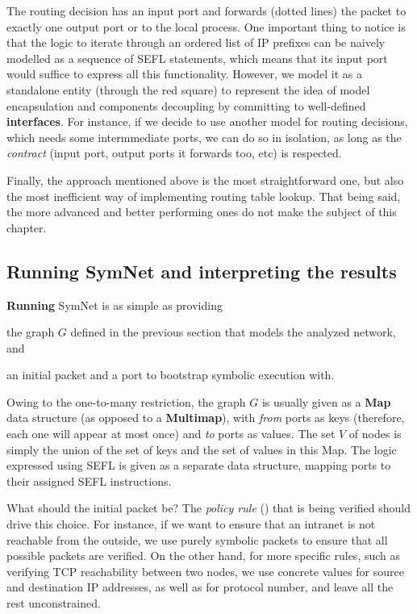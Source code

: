 The routing decision has an input port and forwards (dotted lines) the packet
to exactly one output port or to the local process.  One important thing to
notice is that the logic to iterate through an ordered list of IP prefixes can
be naively modelled as a sequence of  SEFL statements,
which means that its input port would suffice to express all this
functionality.  However, we model it as a standalone entity (through the red
square) to represent the idea of model encapsulation and components decoupling
by committing to well-defined \textbf{interfaces}.  For instance, if we decide
to use another model for routing decisions, which needs some intermmediate
ports, we can do so in isolation, as long as the \emph{contract} (input port,
output ports it forwards too, etc) is respected.

Finally, the  approach mentioned above is the most
straightforward one, but also the most inefficient way of implementing routing
table lookup. That being said, the more advanced and better performing ones do
not make the subject of this chapter.

\subsection{Running SymNet and interpreting the results}
\label{sub-sec:running-symnet}

\textbf{Running} SymNet is as simple as providing
\begin{enumerate*}[a)]
  \item the graph $G$ defined in the previous section that models the analyzed
    network, and
  \item an initial packet and a port to bootstrap symbolic execution with.
\end{enumerate*}

Owing to the one-to-many restriction, the graph $G$ is usually given as a
\textbf{Map} data structure (as opposed to a \textbf{Multimap}), with
\emph{from} ports as keys (therefore, each one will appear at most once) and
\emph{to} ports as values.  The set $V$ of nodes is simply the union of the set
of keys and the set of values in this Map.  The logic expressed using SEFL is
given as a separate data structure, mapping ports to their assigned SEFL
instructions.

What should the initial packet be?  The \emph{policy rule}
() that is being verified
should drive this choice.  For instance, if we want to ensure that an intranet
is not reachable from the outside, we use purely symbolic packets to ensure
that all possible packets are verified.  On the other hand, for more specific
rules, such as verifying TCP reachability between two nodes, we use concrete
values for source and destination IP addresses, as well as for protocol number,
and leave all the rest unconstrained.

